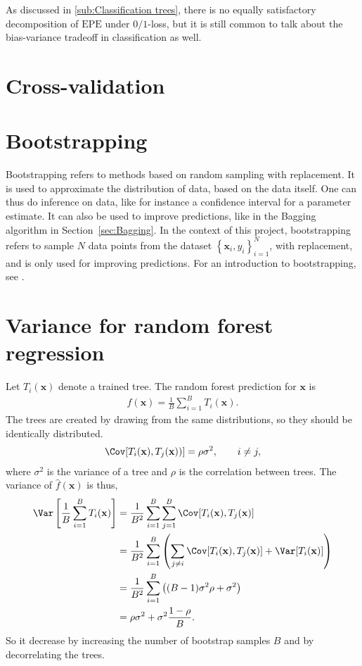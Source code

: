 As discussed in \ref{sub:Classification trees}, there is no equally satisfactory decomposition of $\mathrm{EPE}$ under $0/1$-loss, but it is still common to talk about the bias-variance tradeoff in classification as well.



\section{Cross-validation}
\label{sec:Cross-validation}

\section{Bootstrapping}
\label{sec:Bootstrapping}
Bootstrapping refers to methods based on random sampling with replacement. It is used to approximate the distribution of data, based on the data itself. One can thus do inference on data, like for instance a confidence interval for a parameter estimate. It can also be used to improve predictions, like in the Bagging algorithm in Section~\ref{sec:Bagging}. In the context of this project, bootstrapping refers to sample $N$ data points from the dataset $\left\{ \mathbf{x}_i, y_i \right\}_{i = 1}^N$, with replacement, and is only used for improving predictions. 
For an introduction to bootstrapping, see \cite{efron1994bootstrap}.


\section{Variance for random forest regression}
\label{sec:Variance for random forest regression}
Let $T_i(\mathbf{x})$ denote a trained tree. The random forest prediction for $\mathbf{x}$ is 
\begin{align}
  \hat f(\mathbf{x}) = \frac{1}{B} \sum_{i = 1}^{B} T_i(\mathbf{x}).
\end{align}
The trees are created by drawing from the same distributions, so they should be identically distributed. 
\begin{align}
  \Cov[T_i(\mathbf{x}), T_j(\mathbf{x}))] = \rho \sigma^2, \quad \quad i \neq j,
\end{align}
where $\sigma^2$ is the variance of a tree and $\rho$ is the correlation between trees.  
The variance of $\hat f(\mathbf{x})$ is thus,
\begin{align}
\Var\left[ \frac{1}{B} \sum_{i = 1}^{B} T_i(\mathbf{x}) \right] 
&= \frac{1}{B^2} \sum_{i =1}^B \sum_{j= 1}^B \Cov[T_i(\mathbf{x}), T_j(\mathbf{x})] \notag \\
&= \frac{1}{B^2} \sum_{i =1}^B \left(\sum_{j \neq i} \Cov[T_i(\mathbf{x}), T_j(\mathbf{x})] + \Var[T_i(\mathbf{x})]  \right)\notag \\
&= \frac{1}{B^2} \sum_{i =1}^B \left( (B-1) \sigma^2 \rho + \sigma^2  \right)\notag \\
&= \rho \sigma^2 + \sigma^2 \frac{1-\rho}{B}.
\end{align}
So it decrease by increasing the number of bootstrap samples $B$ and by decorrelating the trees.
